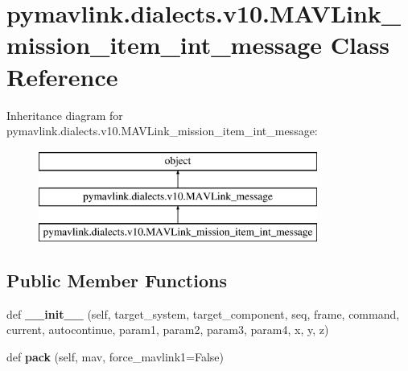 \hypertarget{classpymavlink_1_1dialects_1_1v10_1_1MAVLink__mission__item__int__message}{}\section{pymavlink.\+dialects.\+v10.\+M\+A\+V\+Link\+\_\+mission\+\_\+item\+\_\+int\+\_\+message Class Reference}
\label{classpymavlink_1_1dialects_1_1v10_1_1MAVLink__mission__item__int__message}
Inheritance diagram for pymavlink.\+dialects.\+v10.\+M\+A\+V\+Link\+\_\+mission\+\_\+item\+\_\+int\+\_\+message\+:\begin{figure}[H]
\begin{center}
\leavevmode
\includegraphics[height=3.000000cm]{classpymavlink_1_1dialects_1_1v10_1_1MAVLink__mission__item__int__message}
\end{center}
\end{figure}
\subsection*{Public Member Functions}
\begin{DoxyCompactItemize}
\item 
\mbox{\label{classpymavlink_1_1dialects_1_1v10_1_1MAVLink__mission__item__int__message_a95f65fa404573cbd5dddcb704c49ab71}} 
def {\bfseries \+\_\+\+\_\+init\+\_\+\+\_\+} (self, target\+\_\+system, target\+\_\+component, seq, frame, command, current, autocontinue, param1, param2, param3, param4, x, y, z)
\item 
\mbox{\label{classpymavlink_1_1dialects_1_1v10_1_1MAVLink__mission__item__int__message_ae05f507d740bb7cb8204f223b3bef252}} 
def {\bfseries pack} (self, mav, force\+\_\+mavlink1=False)
\end{DoxyCompactItemize}
